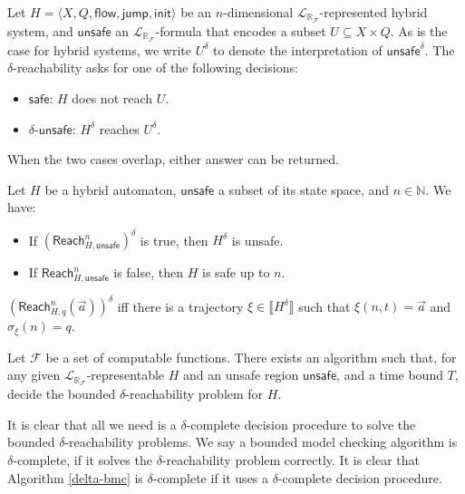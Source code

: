 \documentclass[envcountsect]{llncs}
\newcommand{\flow}{\mathsf{flow}}
\newcommand{\jump}{\mathsf{jump}}
\newcommand{\init}{\mathsf{init}}
\newcommand{\reach}{\mathsf{Reach}}
\newcommand{\unsafe}{\mathsf{unsafe}}
\newcommand{\safe}{\mathsf{safe}}
\newcommand{\lrf}{\mathcal{L}_{\mathbb{R}_{\mathcal{F}}}}
\begin{document}
\begin{definition}
Let $H = \langle X, Q, \flow, \jump,\init\rangle$ be an
$n$-dimensional $\lrf$-represented hybrid system, and $\unsafe$ an
$\lrf$-formula that encodes a subset $U\subseteq X\times Q$. As is the case for
hybrid systems, we write $U^{\delta}$ to denote the interpretation of
$\unsafe^{\delta}$.  The $\delta$-reachability asks for one of the
following decisions:
\begin{itemize}
\item $\safe$: $H$ does not reach $U$. 
\item $\delta$-$\unsafe$: $H^{\delta}$ reaches $U^{\delta}$.
\end{itemize}
When the two cases overlap, either answer can be returned.
\end{definition}

\begin{lemma}\label{bmclemma}
Let $H$ be a hybrid automaton, $\unsafe$ a subset of its state space, and
$n\in\mathbb{N}$. We have:
\begin{itemize}
\item If $(\reach^n_{H,\unsafe})^{\delta}$ is true, then $H^{\delta}$ is unsafe.
\item If $\reach^n_{H,\unsafe}$ is false, then $H$ is safe up to $n$.
\end{itemize}
\end{lemma}

\begin{proposition}\label{equiv-delta}
$(\reach_{H,q}^n(\vec a))^{\delta}$ iff there is a trajectory $\xi\in
\llbracket H^{\delta}\rrbracket$ such that $\xi(n, t) = \vec a$ and
$\sigma_{\xi}(n) = q$.
\end{proposition}

\begin{theorem}
Let $\mathcal{F}$ be a set of computable functions. There exists an algorithm
such that, for any given $\lrf$-representable $H$ and an unsafe region
$\unsafe$, and a time bound $T$, decide the bounded $\delta$-reachability
problem for $H$.
\end{theorem}
It is clear that all we need is a $\delta$-complete decision procedure to solve
the bounded $\delta$-reachability problems. We say a bounded model checking
algorithm is $\delta$-complete, if it solves the $\delta$-reachability problem
correctly. It is clear that Algorithm \ref{delta-bmc} is $\delta$-complete if it
uses a $\delta$-complete decision procedure.
\end{document}
